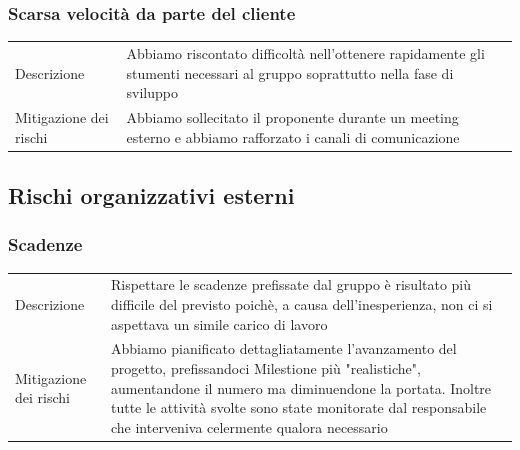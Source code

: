 \documentclass{article}
\begin{document}
\subsubsection{Scarsa velocità da parte del cliente}
\begin{center}
\begin{tabular}{P{10em} P{20em}} 
     Descrizione & Abbiamo riscontato difficoltà nell'ottenere rapidamente gli stumenti necessari al gruppo soprattutto nella fase di sviluppo \\ 
    Mitigazione dei rischi & Abbiamo sollecitato il proponente durante un meeting esterno e abbiamo rafforzato i canali di comunicazione \\
\end{tabular}
\label{tab:mitcliente}
\end{center}

\subsection{Rischi organizzativi esterni}
\subsubsection{Scadenze}
\begin{center}
\begin{tabular}{P{10em} P{20em}} 
     Descrizione & Rispettare le scadenze prefissate dal gruppo è risultato più difficile del previsto poichè, a causa dell'inesperienza, non ci si aspettava un simile carico di lavoro \\ 
    Mitigazione dei rischi &  Abbiamo pianificato dettagliatamente l'avanzamento del progetto, prefissandoci Milestione più "realistiche", aumentandone il numero ma diminuendone la portata. Inoltre tutte le attività svolte sono state monitorate dal responsabile che interveniva celermente qualora necessario\\
\end{tabular}
\label{tab:mitscadenze}
\end{center}
\end{document}
